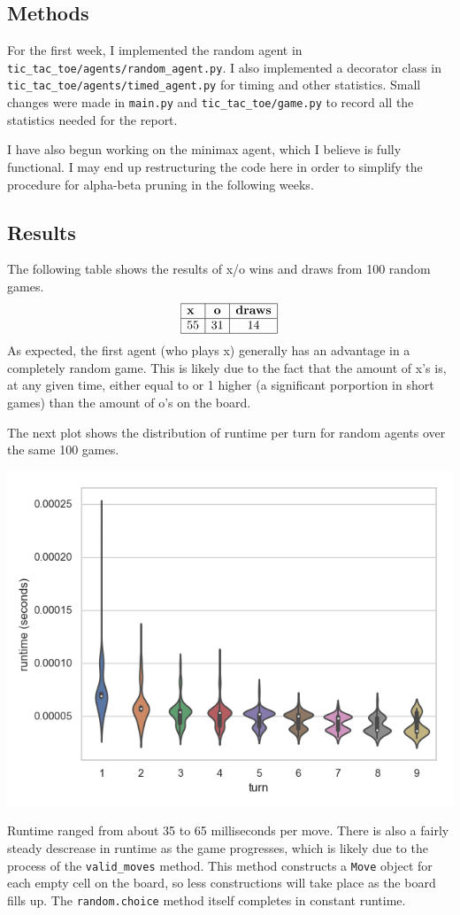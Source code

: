 \subsection{Methods}
For the first week, I implemented the random agent in \texttt{tic\_tac\_toe/agents/random\_agent.py}. I also implemented a decorator class in \texttt{tic\_tac\_toe/agents/timed\_agent.py} for timing and other statistics. Small changes were made in \texttt{main.py} and \texttt{tic\_tac\_toe/game.py} to record all the statistics needed for the report.

I have also begun working on the minimax agent, which I believe is fully functional. I may end up restructuring the code here in order to simplify the procedure for alpha-beta pruning in the following weeks.

\subsection{Results}
The following table shows the results of x/o wins and draws from 100 random games.
\[
    \begin{array}{|l|c|c|}
        \hline
        \textbf{x} & \textbf{o} & \textbf{draws}\\
        \hline
        55 & 31 & 14\\
        \hline
    \end{array}    
\]
As expected, the first agent (who plays x) generally has an advantage in a completely random game. This is likely due to the fact that the amount of x's is, at any given time, either equal to or 1 higher (a significant porportion in short games) than the amount of o's on the board.

The next plot shows the distribution of runtime per turn for random agents over the same 100 games.

\hspace*{.3in}
\includegraphics[scale=.7]{../../plots/random_random/runtime.png}

Runtime ranged from about 35 to 65 milliseconds per move. There is also a fairly steady descrease in runtime as the game progresses, which is likely due to the process of the \texttt{valid\_moves} method. This method constructs a \texttt{Move} object for each empty cell on the board, so less constructions will take place as the board fills up. The \texttt{random.choice} method itself completes in constant runtime.